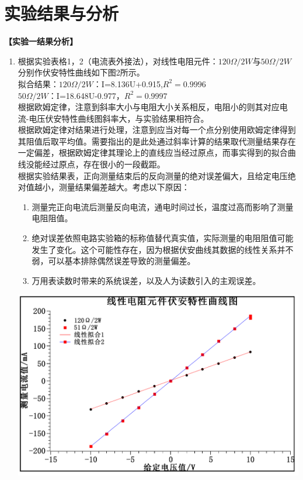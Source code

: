 \documentclass[a4paper]{article}
\begin{document}
\section{实验结果与分析}
\begin{flushleft}
    \bfseries{}\songti 【实验一结果分析】
\end{flushleft}
\begin{enumerate}
    \item 根据实验表格1，2（电流表外接法），对线性电阻元件：$120\Omega/2W$与$50\Omega/2W$分别作伏安特性曲线如下图2所示。\\拟合结果：$120\Omega/2W$：I=8.136U+0.915,$R^2=0.9996$ \\ $50\Omega/2W$：I=18.648U-0.977，$R^2=0.9997$\\根据欧姆定律，注意到斜率大小与电阻大小关系相反，电阻小的则其对应电流-电压伏安特性曲线图斜率大，与实验结果相符合。\\根据欧姆定律对结果进行处理，注意到应当对每一个点分别使用欧姆定律得到其阻值后取平均值。需要指出的是此处通过斜率计算的结果取代测量结果存在一定偏差，根据欧姆定律其理论上的直线应当经过原点，而事实得到的拟合曲线没能经过原点，存在很小的一段截距。\\ 根据实验结果表，正向测量结束后的反向测量的绝对误差偏大，且给定电压绝对值越小，测量结果偏差越大。考虑以下原因：
    \begin{enumerate}
        \item 测量完正向电流后测量反向电流，通电时间过长，温度过高而影响了测量电阻阻值。
        \item 绝对误差依照电路实验箱的标称值替代真实值，实际测量的电阻阻值可能发生了变化。这个可能性存在，因为根据伏安曲线其数据的线性关系并不弱，可以基本排除偶然误差导致的测量偏差。
        \item 万用表读数时带来的系统误差，以及人为读数引入的主观误差。
    \end{enumerate}
    \begin{center}
        \includegraphics[width=\textwidth-40mm]{002}\\

\end{center}
\end{enumerate}
\end{document}
